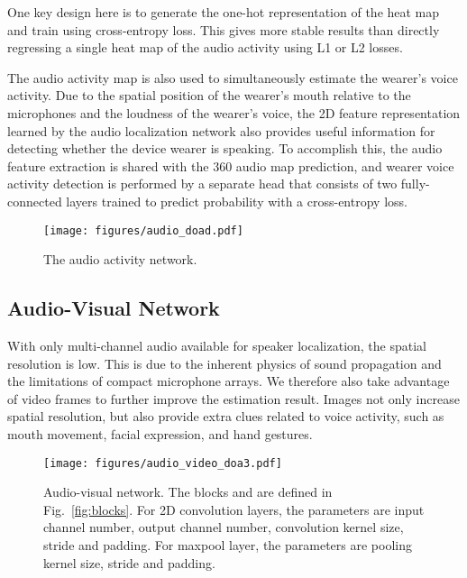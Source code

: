 \documentclass[10pt,twocolumn,letterpaper]{article}
\begin{document}
One key design here is to generate the one-hot representation of the heat map and train using cross-entropy loss. 
This gives more stable results than  
directly regressing a single heat map of the audio activity using L1 or L2 losses.

The audio activity map is also used to simultaneously estimate the wearer's voice activity.
Due to the spatial position of the wearer's mouth relative to the microphones and the loudness
of the wearer's voice, the 2D feature representation learned by the audio localization network also 
provides useful information for detecting whether the device wearer is speaking.
To accomplish this, the audio feature extraction is shared with the 360 audio map prediction,
and wearer voice activity detection is performed by a separate head that consists of two fully-connected layers
trained to predict probability with a cross-entropy loss.

\begin{figure}[tb]
\centering
\texttt{[image: figures/audio\_doad.pdf]}
\vspace{-5pt}
\caption{The audio activity network.}
\vspace{-10pt}
\label{fig:audio-doa}	
\end{figure}

\subsection{Audio-Visual Network} \label{sec:audio-visual}


With only multi-channel audio available for speaker localization, the spatial resolution is low. This is due to the
inherent physics of sound propagation and the limitations of compact microphone arrays. 
We therefore also take advantage of video frames to further improve the estimation result. 
Images not only increase spatial resolution, but also provide extra clues related to voice activity, such as 
mouth movement, facial expression, and hand gestures.

\begin{figure}[tb]
\centering
\texttt{[image: figures/audio\_video\_doa3.pdf]}
\vspace{-5pt}
	\caption{Audio-visual network. The blocks  and  are defined in Fig.~\ref{fig:blocks}.
	For 2D convolution layers, the parameters are input channel number, output channel number, 
	convolution kernel size, stride and padding. For maxpool layer, the parameters are pooling kernel size,
	stride and padding.
	} 
\vspace{-10pt}	
\label{fig:audio-video-doa}	
\end{figure}
\end{document}
